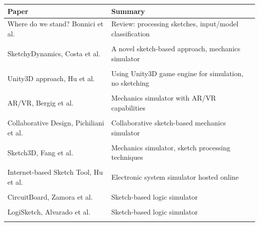 \documentclass[11pt]{article}
\begin{document}
\begin{table}[htpb]
    \footnotesize\centering
    \begin{tabular}{
        @{}
        l
        >{\raggedright\arraybackslash}p{7cm}
        l
        @{}
        }
        Paper                                                  &
        Summary                                                  \\
        \midrule
        Where do we stand? Bonnici et al. \cite{101017S}       &
        Review: processing sketches, input/model classification  \\
        \\

        SketchyDynamics, Costa et al. \cite{109781I}           &
        A novel sketch-based approach, mechanics simulator       \\
        \\

        Unity3D approach, Hu et al. \cite{6274802}             &
        Using Unity3D game engine for simulation, no sketching   \\
        \\

        \Gls{AR}/\gls{VR}, Bergig et al. \cite{5336490}        &
        Mechanics simulator with \gls{AR}/\gls{VR} capabilities  \\
        \\

        Collaborative Design, Pichiliani et al. \cite{5460522} &
        Collaborative sketch-based mechanics simulator           \\
        \\

        Sketch3D, Fang et al. \cite{4722231}                   &
        Mechanics simulator, sketch processing techniques        \\
        \\

        Internet-based Sketch Tool, Hu et al. \cite{5432817}   &
        Electronic system simulator hosted online                \\
        \\

        CircuitBoard, Zamora et al. \cite{20090001}            &
        Sketch-based logic simulator                             \\
        \\

        LogiSketch, Alvarado et al. \cite{9155937}             &
        Sketch-based logic simulator                             \\
        \\


\end{tabular}
\end{table}
\end{document}
